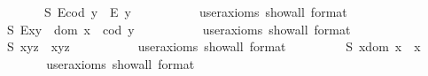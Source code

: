 \begin{isabellebody}
\isadelimproof
\ %
\endisadelimproof
%
\isatagproof
{}\isamarkupfalse%
%
\endisatagproof
{\isafoldproof}%
%
\isadelimproof
%
\endisadelimproof
\ \isanewline
\ \ \isamarkupfalse%
\ S{}{\isacharcolon}\ {\isachardoublequoteopen}E{\isacharparenleft}cod\ y{\isacharparenright}\ \isactrlbold {\isasymrightarrow}\ E\ y{\isachardoublequoteclose}\ \ %
\ \ \isanewline
\ \ \ \ \isamarkupfalse%
\ {\isacharbrackleft}user{\isacharunderscore}axioms{\isacharcomma}\ show{\isacharunderscore}all{\isacharcomma}\ format\ {\isacharequal}\ {}{\isacharbrackright}%
\isadelimproof
\ %
\endisadelimproof
%
\isatagproof
{}\isamarkupfalse%
%
\endisatagproof
{\isafoldproof}%
%
\isadelimproof
%
\endisadelimproof
\ \isanewline
\ \ \isamarkupfalse%
\ S{}{\isacharcolon}\ {\isachardoublequoteopen}E{\isacharparenleft}x{\isasymcdot}y{\isacharparenright}\ \isactrlbold {\isasymleftrightarrow}\ dom\ x\ {\isasymsimeq}\ cod\ y{\isachardoublequoteclose}\ \ \ %
\ \isanewline
\ \ \ \ \isamarkupfalse%
\ {\isacharbrackleft}user{\isacharunderscore}axioms{\isacharcomma}\ show{\isacharunderscore}all{\isacharcomma}\ format\ {\isacharequal}\ {}{\isacharbrackright}%
\isadelimproof
\ %
\endisadelimproof
%
\isatagproof
{}\isamarkupfalse%
%
\endisatagproof
{\isafoldproof}%
%
\isadelimproof
%
\endisadelimproof
\ \isanewline
\ \ \isamarkupfalse%
\ S{}{\isacharcolon}\ {\isachardoublequoteopen}x{\isasymcdot}{\isacharparenleft}y{\isasymcdot}z{\isacharparenright}\ {\isasymcong}\ {\isacharparenleft}x{\isasymcdot}y{\isacharparenright}{\isasymcdot}z{\isachardoublequoteclose}\ \ \ %
\ \isanewline
\ \ \ \ \isamarkupfalse%
\ {\isacharbrackleft}user{\isacharunderscore}axioms{\isacharcomma}\ show{\isacharunderscore}all{\isacharcomma}\ format\ {\isacharequal}\ {}{\isacharbrackright}%
\isadelimproof
\ %
\endisadelimproof
%
\isatagproof
{}\isamarkupfalse%
%
\endisatagproof
{\isafoldproof}%
%
\isadelimproof
%
\endisadelimproof
\ \isanewline
\ \ \isamarkupfalse%
\ S{}{\isacharcolon}\ {\isachardoublequoteopen}x{\isasymcdot}{\isacharparenleft}dom\ x{\isacharparenright}\ {\isasymcong}\ x{\isachardoublequoteclose}\ \ \ %
\ \isanewline
\ \ \ \ \isamarkupfalse%
\ {\isacharbrackleft}user{\isacharunderscore}axioms{\isacharcomma}\ show{\isacharunderscore}all{\isacharcomma}\ format\ {\isacharequal}\ {}{\isacharbrackright}%

\end{isabellebody}
